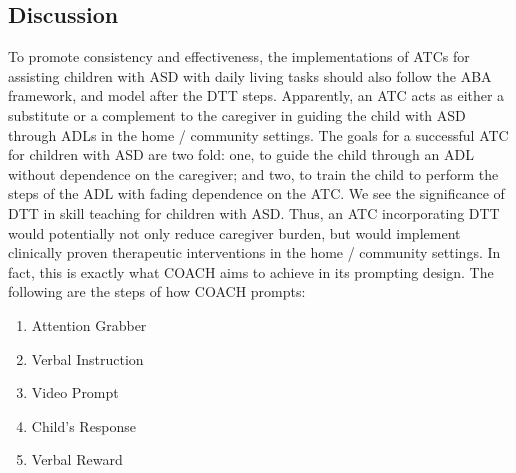 

\subsection{Discussion}
\label{sec:DTTDiscussion}
To promote consistency and effectiveness, the implementations of ATCs for assisting children with ASD with daily living tasks should also follow the ABA framework, and model after the DTT steps.  Apparently, an ATC acts as either a substitute or a complement to the caregiver in guiding the child with ASD through ADLs in the home / community settings.  The goals for a successful ATC for children with ASD are two fold: one, to guide the child through an ADL without dependence on the caregiver; and two, to train the child to perform the steps of the ADL with fading dependence on the ATC.  We see the significance of DTT in skill teaching for children with ASD.  Thus, an ATC incorporating DTT would potentially not only reduce caregiver burden, but would implement clinically proven therapeutic interventions in the home / community settings.  In fact, this is exactly what COACH aims to achieve in its prompting design.  The following are the steps of how COACH prompts:
\begin{enumerate}
	\item Attention Grabber
	\item Verbal Instruction
	\item Video Prompt
	\item Child's Response
	\item Verbal Reward
\end{enumerate}
